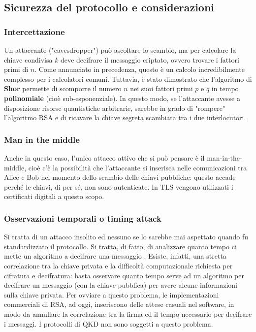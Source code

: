 \subsection{Sicurezza del protocollo e considerazioni}
\subsubsection{Intercettazione}
Un attaccante ("eavesdropper") può ascoltare lo scambio, ma per calcolare la chiave condivisa $k$ deve decifrare il messaggio criptato, ovvero trovare i fattori primi di $n$. Come annunciato in precedenza, questo è un calcolo incredibilmente complesso per i calcolatori comuni. Tuttavia, è stato dimostrato che l'algoritmo di \textbf{Shor} \cite{shor_polynomial-time_1997} permette di scomporre il numero $n$ nei suoi fattori primi $p$ e $q$ in tempo \textbf{polinomiale} (cioè sub-esponenziale). In questo modo, se l'attaccante avesse a disposizione risorse quantistiche arbitrarie, sarebbe in grado di "rompere" l'algoritmo RSA e di ricavare la chiave segreta scambiata tra i due interlocutori.
\subsubsection{Man in the middle}
Anche in questo caso, l'unico attacco attivo che si può pensare è il man-in-the-middle, cioè c'è la possibilità che l'attaccante si inserisca nelle comunicazioni tra Alice e Bob nel momento dello scambio delle chiavi pubbliche: questo accade perché le chiavi, di per sé, non sono autenticate. In TLS vengono utilizzati i certificati digitali a questo scopo.
\subsubsection{Osservazioni temporali o timing attack}
Si tratta di un attacco insolito ed nessuno se lo sarebbe mai aspettato quando fu standardizzato il protocollo. Si tratta, di fatto, di analizzare quanto tempo ci mette un algoritmo a decifrare una messaggio \cite{timing_attack}. Esiste, infatti, una stretta correlazione tra la chiave privata e la difficoltà computazionale richiesta per cifratura e decifratura: basta osservare quanto tempo serve ad un algoritmo per decifrare un messaggio (con la chiave pubblica) per avere alcune informazioni sulla chiave privata. Per ovviare a questo problema, le implementazioni commerciali di RSA, ad oggi, inseriscono delle attese casuali nel software, in modo da annullare la correlazione tra la firma ed il tempo necessario per decifrare i messaggi. I protocolli di QKD non sono soggetti a questo problema.
